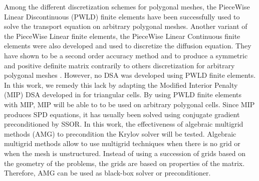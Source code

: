 Among the different discretization schemes for polygonal meshes, the PieceWise 
Linear Discontinuous (PWLD) finite elements \cite{pwld_3d,pwld_2d} 
have been successfully used to solve the transport equation on arbitrary
polygonal meshes. Another variant of the PieceWise Linear finite elements, the
PieceWise Linear Continuous finite elements were also developed and used 
to discretize the diffusion equation. They have shown to be a second order
accuracy method and to produce a symmetric and positive definite matrix 
\cite{pwl_diffusion} contrarily to others discretization for arbitrary
polygonal meshes \cite{pwl_diffusion}. However, no DSA 
\cite{dsa_ref,larsen_dsa,consistent_p1} was developed using PWLD finite
elements. In this work, we remedy this lack by adapting the Modified Interior 
Penalty (MIP) DSA developed in \cite{mip} for triangular cells. By using PWLD 
finite elements with MIP, MIP will be able to to be used on arbitrary polygonal 
cells. Since MIP produces SPD equations, it has usually been solved using conjugate 
gradient preconditioned by SSOR. In this work, the effectiveness of algebraic 
multigrid methods (AMG) to precondition the Krylov solver \cite{amg,amg_course} 
will be tested. Algebraic multigrid methods allow to use multigrid techniques 
when there is no grid or when the mesh is unstructured. Instead of using a 
succession of grids based on the geometry of the problems, the grids are based 
on properties of the matrix. Therefore, AMG can be used as black-box solver or 
preconditioner.
